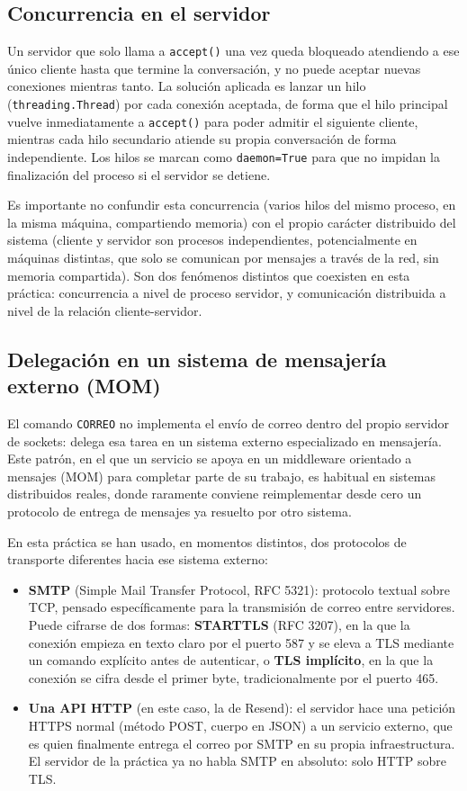 \documentclass[12pt,a4paper]{article}
\begin{document}
\subsection{Concurrencia en el servidor}

Un servidor que solo llama a \texttt{accept()} una vez queda bloqueado atendiendo a ese único cliente hasta que termine la conversación, y no puede aceptar nuevas conexiones mientras tanto. La solución aplicada es lanzar un hilo (\texttt{threading.Thread}) por cada conexión aceptada, de forma que el hilo principal vuelve inmediatamente a \texttt{accept()} para poder admitir el siguiente cliente, mientras cada hilo secundario atiende su propia conversación de forma independiente. Los hilos se marcan como \texttt{daemon=True} para que no impidan la finalización del proceso si el servidor se detiene.

Es importante no confundir esta concurrencia (varios hilos del mismo proceso, en la misma máquina, compartiendo memoria) con el propio carácter distribuido del sistema (cliente y servidor son procesos independientes, potencialmente en máquinas distintas, que solo se comunican por mensajes a través de la red, sin memoria compartida). Son dos fenómenos distintos que coexisten en esta práctica: concurrencia a nivel de proceso servidor, y comunicación distribuida a nivel de la relación cliente-servidor.

\subsection{Delegación en un sistema de mensajería externo (MOM)}

El comando \texttt{CORREO} no implementa el envío de correo dentro del propio servidor de sockets: delega esa tarea en un sistema externo especializado en mensajería. Este patrón, en el que un servicio se apoya en un middleware orientado a mensajes (MOM) para completar parte de su trabajo, es habitual en sistemas distribuidos reales, donde raramente conviene reimplementar desde cero un protocolo de entrega de mensajes ya resuelto por otro sistema.

En esta práctica se han usado, en momentos distintos, dos protocolos de transporte diferentes hacia ese sistema externo:

\begin{itemize}
    \item \textbf{SMTP} (Simple Mail Transfer Protocol, RFC 5321): protocolo textual sobre TCP, pensado específicamente para la transmisión de correo entre servidores. Puede cifrarse de dos formas: \textbf{STARTTLS} (RFC 3207), en la que la conexión empieza en texto claro por el puerto 587 y se eleva a TLS mediante un comando explícito antes de autenticar, o \textbf{TLS implícito}, en la que la conexión se cifra desde el primer byte, tradicionalmente por el puerto 465.
    \item \textbf{Una API HTTP} (en este caso, la de Resend): el servidor hace una petición HTTPS normal (método POST, cuerpo en JSON) a un servicio externo, que es quien finalmente entrega el correo por SMTP en su propia infraestructura. El servidor de la práctica ya no habla SMTP en absoluto: solo HTTP sobre TLS.
\end{itemize}
\end{document}
